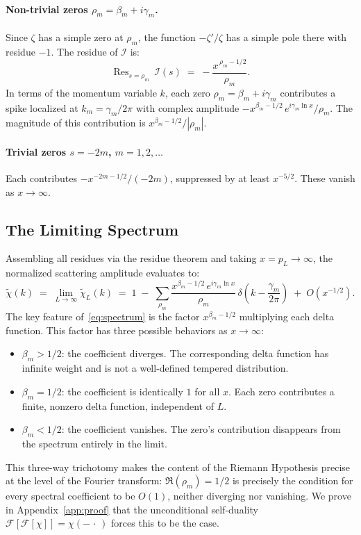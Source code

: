 \documentclass[11pt, oneside]{article}
\theoremstyle{definition}
\begin{document}
\paragraph{Non-trivial zeros $\rho_m = \beta_m + i\gamma_m$.}
Since $\zeta$ has a simple zero at $\rho_m$, the function
$-\zeta'/\zeta$ has a simple pole there with residue $-1$.
The residue of $\mathcal{I}$ is:
\begin{equation}
  \operatorname{Res}_{s=\rho_m}\,\mathcal{I}(s)
  \;=\; -\frac{x^{\,\rho_m - 1/2}}{\rho_m}.
  \label{eq:nontrivial_res}
\end{equation}
In terms of the momentum variable $k$, each zero
$\rho_m = \beta_m + i\gamma_m$ contributes a spike localized at
$k_m = \gamma_m/2\pi$ with complex amplitude
$-x^{\beta_m - 1/2}\,e^{i\gamma_m \ln x}/\rho_m$.
The magnitude of this contribution is
$x^{\beta_m - 1/2}/|\rho_m|$.

\paragraph{Trivial zeros $s = -2m$, $m = 1, 2, \ldots$}
Each contributes $-x^{-2m-1/2}/(-2m)$, suppressed by at least
$x^{-5/2}$. These vanish as $x\to\infty$.

\subsection{The Limiting Spectrum}

Assembling all residues via the residue theorem and taking
$x = p_L \to \infty$, the normalized scattering amplitude
evaluates to:
\begin{equation}
  \tilde{\chi}(k)
  \;=\; \lim_{L\to\infty}\tilde{\chi}_L(k)
  \;=\; 1 \;-\; \sum_{\rho_m}
        \frac{x^{\beta_m-1/2}\,e^{i\gamma_m\ln x}}{\rho_m}
        \,\delta\!\left(k - \frac{\gamma_m}{2\pi}\right)
        \;+\; O\!\left(x^{-1/2}\right).
  \label{eq:spectrum}
\end{equation}
The key feature of~\eqref{eq:spectrum} is the factor
$x^{\beta_m - 1/2}$ multiplying each delta function.
This factor has three possible behaviors as $x\to\infty$:
\begin{itemize}
  \item $\beta_m > 1/2$: the coefficient diverges.
        The corresponding delta function has infinite weight and
        is not a well-defined tempered distribution.
  \item $\beta_m = 1/2$: the coefficient is identically $1$
        for all $x$. Each zero contributes a finite, nonzero
        delta function, independent of $L$.
  \item $\beta_m < 1/2$: the coefficient vanishes.
        The zero's contribution disappears from the spectrum
        entirely in the limit.
\end{itemize}
This three-way trichotomy makes the content of the Riemann
Hypothesis precise at the level of the Fourier transform:
$\Re(\rho_m)=1/2$ is precisely the condition for every spectral
coefficient to be $O(1)$, neither diverging nor vanishing.
We prove in Appendix~\ref{app:proof} that the unconditional
self-duality $\mathcal{F}[\mathcal{F}[\chi]]=\chi(-\,\cdot\,)$
forces this to be the case.
\end{document}

